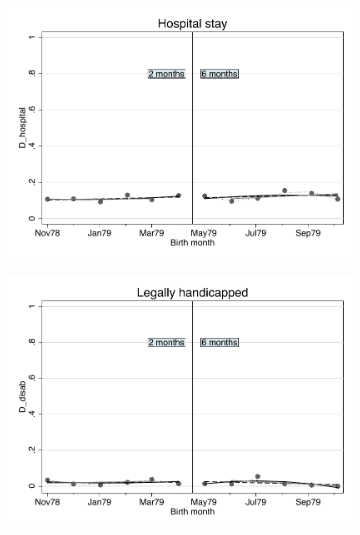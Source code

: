 \documentclass[a4paper ]{article}
\begin{document}
\begin{figure}[p]
\begin{subfigure}[h]{0.48\textwidth}\centering
	\includegraphics[width=\textwidth]{../../analysis/graphs/SOEP/D_hospital_RD.pdf}
\end{subfigure}
\quad
\begin{subfigure}[h]{0.48\textwidth}\centering
	\includegraphics[width=\textwidth]{../../analysis/graphs/SOEP/D_disab_RD.pdf}
\end{subfigure}


\end{figure}
\end{document}
